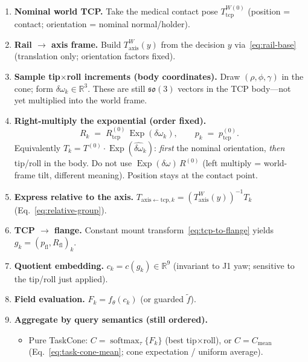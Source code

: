 \documentclass[11pt,a4paper]{article}
\newcommand{\R}{\mathbb{R}}
\newcommand{\Taxis}{T_{\mathrm{axis}}}
\newcommand{\softmax}{\operatorname{softmax}}
\begin{document}
\begin{enumerate}[leftmargin=1.6em]
  \item \textbf{Nominal world TCP.}
        Take the medical contact pose \(T_{\mathrm{tcp}}^{W(0)}\) (position =
        contact; orientation = nominal normal/holder).
  \item \textbf{Rail \(\to\) axis frame.}
        Build \(\Taxis^{W}(y)\) from the decision \(y\) via~\eqref{eq:rail-base}
        (translation only; orientation factors fixed).
  \item \textbf{Sample tip$\times$roll increments (body coordinates).}
        Draw \((\rho,\phi,\gamma)\) in the cone; form \(\delta\omega_{k}\in\R^{3}\).
        These are still \(\mathfrak{so}(3)\) vectors in the TCP body---not yet
        multiplied into the world frame.
  \item \textbf{Right-multiply the exponential (order fixed).}
        \[
          R_{k}
          \;=\;
          R_{\mathrm{tcp}}^{(0)}\,
          \operatorname{Exp}(\delta\omega_{k}),
          \qquad
          p_{k}
          \;=\;
          p_{\mathrm{tcp}}^{(0)}.
        \]
        Equivalently \(T_{k}=T^{(0)}\cdot\operatorname{Exp}(\widehat{\delta\omega}_{k})\):
        \emph{first} the nominal orientation, \emph{then} tip/roll in the body.
        Do not use \(\operatorname{Exp}(\delta\omega)\,R^{(0)}\) (left multiply =
        world-frame tilt, different meaning). Position stays at the contact point.
  \item \textbf{Express relative to the axis.}
        \(T_{\mathrm{axis\leftarrow tcp},k}
        =(\Taxis^{W}(y))^{-1}T_{k}\) (Eq.~\eqref{eq:relative-group}).
  \item \textbf{TCP \(\to\) flange.}
        Constant mount transform~\eqref{eq:tcp-to-flange} yields
        \(g_{k}=(p_{\mathrm{fl}},R_{\mathrm{fl}})_{k}\).
  \item \textbf{Quotient embedding.}
        \(c_{k}=c(g_{k})\in\R^{9}\) (invariant to J1 yaw; sensitive to the tip/roll
        just applied).
  \item \textbf{Field evaluation.}
        \(F_{k}=f_{\theta}(c_{k})\) (or guarded \(\tilde f\)).
  \item \textbf{Aggregate by query semantics (still ordered).}
        \begin{itemize}[leftmargin=1.2em]
          \item Pure TaskCone: \(C=\softmax_{\tau}\{F_{k}\}\) (best tip$\times$roll),
                or \(C=C_{\mathrm{mean}}\) (Eq.~\eqref{eq:task-cone-mean}; cone
                expectation / uniform average).

\end{itemize}
\end{enumerate}
\end{document}
